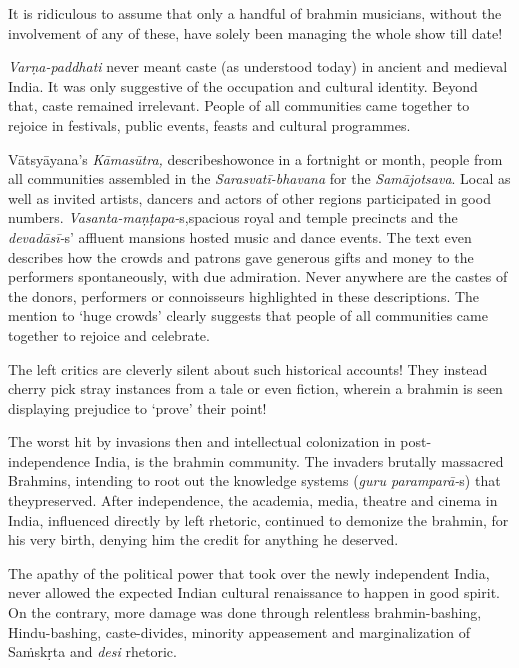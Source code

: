 It is ridiculous to assume that only a handful of brahmin musicians, without the involvement of any of these, have solely been managing the whole show till date!

\textit{Varṇa-paddhati} never meant caste (as understood today) in ancient and medieval India. It was only suggestive of the occupation and cultural identity. Beyond that, caste remained irrelevant. People of all communities came together to rejoice in festivals, public events, feasts and cultural programmes.

Vātsyāyana’s \textit{Kāmasūtra,} describeshowonce in a fortnight or month, people from all communities assembled in the \textit{Sarasvatī-bhavana} for the \textit{Samājotsava}. Local as well as invited artists, dancers and actors of other regions participated in good numbers. \textit{Vasanta-maṇṭapa-}s,\break spacious royal and temple precincts and the \textit{devadāsī-}s’ affluent mansions hosted music and dance events. The text even describes how the crowds and patrons gave generous gifts and money to the performers spontaneously, with due admiration. Never anywhere are the castes of the donors, performers or connoisseurs highlighted in these descriptions. The mention to ‘huge crowds’ clearly suggests that people of all communities came together to rejoice and celebrate.

The left critics are cleverly silent about such historical accounts! They instead cherry pick stray instances from a tale or even fiction, wherein a brahmin is seen displaying prejudice to ‘prove’ their point!

The worst hit by invasions then and intellectual colonization in post-independence India, is the brahmin community. The invaders brutally massacred Brahmins, intending to root out the knowledge systems (\textit{guru paramparā-}s) that theypreserved. After independence, the academia, media, theatre and cinema in India, influenced directly by left rhetoric, continued to demonize the brahmin, for his very birth, denying him the credit for anything he deserved.

The apathy of the political power that took over the newly independent India, never allowed the expected Indian cultural renaissance to happen in good spirit. On the contrary, more damage was done through relentless brahmin-bashing, Hindu-bashing, caste-divides, minority appeasement and marginalization of Saṁskṛta and \textit{desi} rhetoric.


